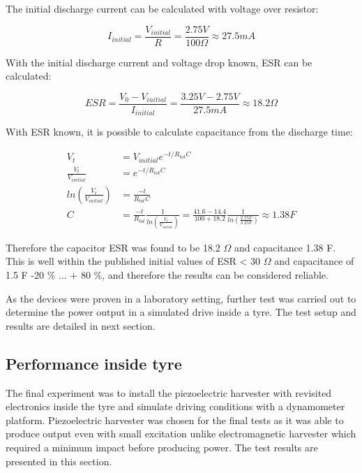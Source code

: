 The initial discharge current can be calculated with voltage over resistor:

\begin{equation}
  I_{initial} = \frac{V_{initial}}{R} = \frac{2.75 V}{100 \Omega} \approx 27.5 mA 
\end{equation}

With the initial discharge current and voltage drop known, ESR can be calculated:

\begin{equation}
  ESR = \frac{V_{0} - V_{initial}}{I_{initial}} = \frac{3.25 V - 2.75 V}{27.5 mA} \approx 18.2 \Omega
\end{equation}

With ESR known, it is possible to calculate capacitance from the discharge time:

\begin{equation}
\begin{split}
  V_t                            &= V_{initial}e^{-t/R_{tot}C} \\
  \frac{V_t}{V_{initial}}                &= e^{-t/R_{tot}C} \\
  ln\left(\frac{V_t}{V_{initial}}\right) &= \frac{-t}{R_{tot}C} \\
  C                              &= \frac{-t}{R_{tot}} \frac{1}{ ln\left(\frac{V_t}{V_{initial}}\right)} = \frac{41.6-14.4}{100 + 18.2} \frac{1}{ ln\left(\frac{2.75 V}{3.25 V}\right)} \approx 1.38 F
\end{split}
\end{equation}

Therefore the capacitor ESR was found to be 18.2 $\Omega$ and capacitance 1.38 F. This is well within the published \cite{panasonic_scap} initial values of ESR < 30 $\Omega$ and capacitance of 1.5 F -20 \% ... + 80 \%, and therefore the results can be considered reliable. 

As the devices were proven in a laboratory setting, further test was carried out to determine the power output in a simulated drive inside a tyre. The test setup and results are detailed in next section.

\subsection{Performance inside tyre}
The final experiment was to install the piezoelectric harvester with revisited electronics inside the tyre and simulate driving conditions with a dynamometer platform. Piezoelectric harvester was chosen for the final tests as it was able to produce output even with small excitation unlike electromagnetic harvester which required a minimum impact before producing power. The test results are presented in this section. 

